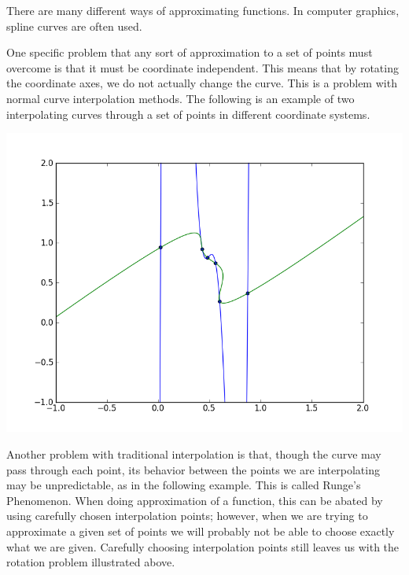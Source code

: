 

There are many different ways of approximating functions. 
In computer graphics, spline curves are often used. 

One specific problem that any sort of approximation to a set of points must overcome is that it must be coordinate independent. 
This means that by rotating the coordinate axes, we do not actually change the curve. 
This is a problem with normal curve interpolation methods. 
The following is an example of two interpolating curves through a set of points in different coordinate systems.

\includegraphics[width=\textwidth]{bad_interpolation}

Another problem with traditional interpolation is that, though the curve may pass through each point, its behavior between the points we are interpolating may be unpredictable, as in the following example. 
This is called Runge's Phenomenon. 
When doing approximation of a function, this can be abated by using carefully chosen interpolation points; however, when we are trying to approximate a given set of points we will probably not be able to choose exactly what we are given. 
Carefully choosing interpolation points still leaves us with the rotation problem illustrated above.


